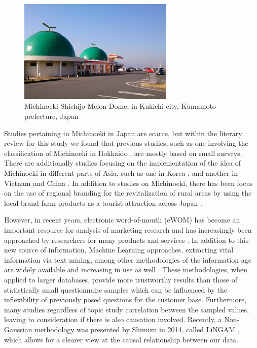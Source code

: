 \documentclass[review]{elsarticle}
\begin{document}
\begin{figure}[htp]
\centering
\includegraphics[width=20em]{melon-dome.png}
\caption{Michinoeki Shichijo Melon Dome, in Kukichi city, Kumamoto prefecture, Japan \protect\footnotemark}
\label{fig:melon}
\end{figure}


Studies pertaining to Michinoeki in Japan are scarce, but within the literary review for this study we found that previous studies, such as one involving the classification of Michinoeki in Hokkaido \cite[][]{ogawa2001}, are mostly based on small surveys. There are additionally studies focusing on the implementation of the idea of Michinoeki in different parts of Asia, such as one in Korea \cite[][]{lee2016}, and another in Vietnam and China \cite[][]{yokota2006-b}. In addition to studies on Michinoeki, there has been focus on the use of regional branding for the revitalization of rural areas by using the local brand farm products as a tourist attraction across Japan \cite[][]{jones2009,ohe2013,ohe2008-a,ohe2008-b}. 

However, in recent years, electronic word-of-mouth (eWOM) has become an important resource for analysis of marketing research and has increasingly been approached by researchers for many products and services \cite[][]{depelsmacker2018,chevalier2006,liu2006}. In addition to this new source of information, Machine Learning approaches, extracting vital information via text mining, among other methodologies of the information age are widely available and increasing in use as well \cite[e.g.][]{he2013,nonaka2012,oconnor2010,Aleman2018ICAROB,Horino2017IEEM,bollen2011,Aleman2017ISIS,nonaka2014icaicta,nonaka2014itmc,nonaka2013,nonaka2010,sakao2009}. These methodologies, when applied to larger databases, provide more trustworthy results than those of statistically small questionnaire samples which can be influenced by the inflexibility of previously posed questions for the customer base. Furthermore, many studies regardless of topic study correlation between the sampled values, leaving to consideration if there is also causation involved. Recently, a Non-Gaussian methodology was presented by Shimizu in 2014, called LiNGAM \cite[][]{shimizu2014}, which allows for a clearer view at the causal relationship between our data.
\end{document}
